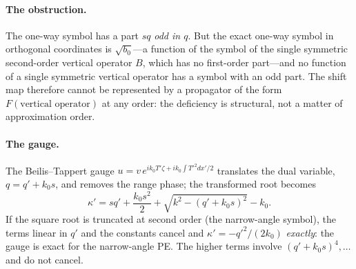 \documentclass[11pt]{article}
\begin{document}
\paragraph{The obstruction.} The one-way symbol has a part $sq$ \emph{odd in
$q$}. But the exact one-way symbol in orthogonal coordinates is
$\sqrt{b_0}$---a function of the symbol of the single symmetric second-order
vertical operator $B$, which has no first-order part---and no function of a
single symmetric vertical operator has a symbol with an odd part. The shift
map therefore cannot be represented by a propagator of the form
$F(\text{vertical operator})$ at any order: the deficiency is structural, not
a matter of approximation order.

\paragraph{The gauge.} The Beilis--Tappert gauge
\cite{beilis1979coupled} $u=v\,e^{ik_0T'\zeta+ik_0\int T'^2dx'/2}$ translates
the dual variable, $q=q'+k_0s$, and removes the range phase; the transformed
root becomes
\[
\kappa'=sq'+\frac{k_0s^2}2+\sqrt{k^2-(q'+k_0s)^2}-k_0 .
\]
If the square root is truncated at second order (the narrow-angle symbol), the
terms linear in $q'$ and the constants cancel and
$\kappa'=-q'^2/(2k_0)$ \emph{exactly}: the gauge is exact for the narrow-angle
PE. The higher terms involve $(q'+k_0s)^4,\dots$ and do not cancel.
\end{document}
